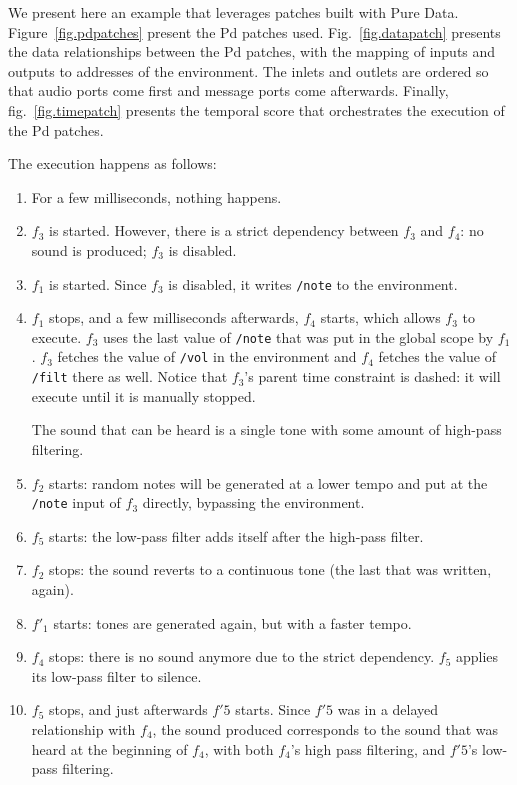 \documentclass{article}
\begin{document}
We present here an example that leverages patches built with Pure Data\cite{puckette1996pure}.
Figure~\ref{fig.pdpatches} present the Pd patches used. Fig.~\ref{fig.datapatch} presents the data relationships between the Pd patches, with the mapping of inputs and outputs to addresses of the environment. 
The inlets and outlets are ordered so that audio ports come first and message ports come afterwards.
Finally, fig.~\ref{fig.timepatch} presents the temporal score that orchestrates the execution of the Pd patches.

The execution happens as follows: 
\begin{enumerate}
    \item For a few milliseconds, nothing happens.
    \item $f_3$ is started. However, there is a strict dependency between $f_3$ and $f_4$: no sound is produced; $f_3$ is disabled.
    \item $f_1$ is started. Since $f_3$ is disabled, it writes \lstinline|/note| to the environment.
    \item $f_1$ stops, and a few milliseconds afterwards, $f_4$ starts, which allows  $f_3$ to execute. $f_3$ uses the last value of \lstinline|/note| that was put in the global scope by $f_1$.
    $f_3$ fetches the value of \lstinline|/vol| in the environment and $f_4$ fetches the value of \lstinline|/filt| there as well.
    Notice that $f_3$'s parent time constraint is dashed: it will execute until it is manually stopped.
    
    The sound that can be heard is a single tone with some amount of high-pass filtering.
    \item $f_2$ starts: random notes will be generated at a lower tempo and put at the \lstinline|/note| input of $f_3$ directly, bypassing the environment.
    
    \item $f_5$ starts: the low-pass filter adds itself after the high-pass filter.
    \item $f_2$ stops: the sound reverts to a continuous tone (the last that was written, again).
    \item $f'_1$ starts: tones are generated again, but with a faster tempo.
    \item $f_4$ stops: there is no sound anymore due to the strict dependency. $f_5$ applies its low-pass filter to silence.
    \item $f_5$ stops, and just afterwards $f'5$ starts. Since $f'5$ was in a delayed relationship with $f_4$, the sound produced corresponds to the sound that was heard at the beginning of $f_4$, with both $f_4$'s high pass filtering, and $f'5$'s low-pass filtering.
\end{enumerate}
\end{document}
